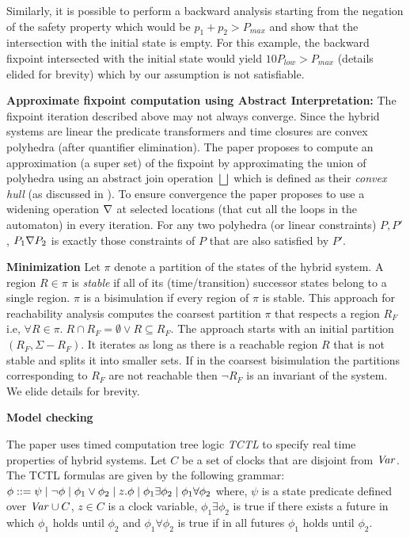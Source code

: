 Similarly, it is possible to perform a backward analysis starting from the negation of the safety property
which would be $p_1 + p_2 > P_{max}$ and show that the intersection with the initial state is empty.
For this example, the backward fixpoint intersected with the initial state would yield $10 P_{low} > P_{max}$
(details elided for brevity) which by our assumption is not satisfiable.

\textbf{Approximate fixpoint computation using Abstract Interpretation:}
The fixpoint iteration described above may not always converge. Since the hybrid  systems are linear
the predicate transformers and time closures are convex polyhedra (after quantifier elimination).
The paper proposes to compute an approximation (a super set) of the fixpoint by approximating the 
union of polyhedra  using an abstract join operation $\bigsqcup$ which is defined as their \emph{convex hull}
(as discussed in \cite{pcousot:1975}).
To ensure convergence the paper proposes to use a widening operation $\nabla$ at selected locations (that cut
all the loops in the automaton) in every iteration. For any two polyhedra (or linear constraints) 
$P,P'$, $P_1 \nabla P_2$  is exactly those constraints of $P$ that are also satisfied by $P'$.

\textbf{Minimization}
Let $\pi$ denote a partition of the states of the hybrid system. A region $R \in \pi$ is \emph{stable} if all of its 
(time/transition) successor states belong to a single region. $\pi$ is a bisimulation if every region of $\pi$
is stable. This approach for reachability analysis computes the coarsest partition $\pi$ that respects
a region $R_F$ i.e, $\forall R \in \pi. \; R \cap R_F = \emptyset \vee R \subseteq R_F$. The approach starts 
with an initial partition $(R_F,\Sigma - R_F)$. It iterates as long as there is a reachable region $R$ that 
is not stable and splits it into smaller sets. If in the coarsest bisimulation the partitions corresponding 
to $R_F$ are not reachable then $\neg R_F$ is an invariant of the system. We elide details for brevity.

\textbf{Model checking}

The paper uses timed computation tree logic \emph{TCTL} to specify real time properties of hybrid systems.
Let $C$ be a set of clocks that are disjoint from $\mathit{Var}$. The TCTL formulas are given by the following grammar: 
$\phi ::= \psi \; | \; \neg \phi \; | \; \phi_1 \vee \phi_2 \; | \; z.\phi \; | \; \phi_1 \exists \phi_2 \; | \; \phi_1 \forall \phi_2$
where, $\psi$ is a state predicate defined over $\mathit{Var} \cup C$, $z \in C$ is a clock variable,
$\phi_1 \exists \phi_2$ is true if there exists a future in which $\phi_1$ holds until $\phi_2$ 
and $\phi_1 \forall \phi_2$ is true if in all futures $\phi_1$ holds until $\phi_2$.

